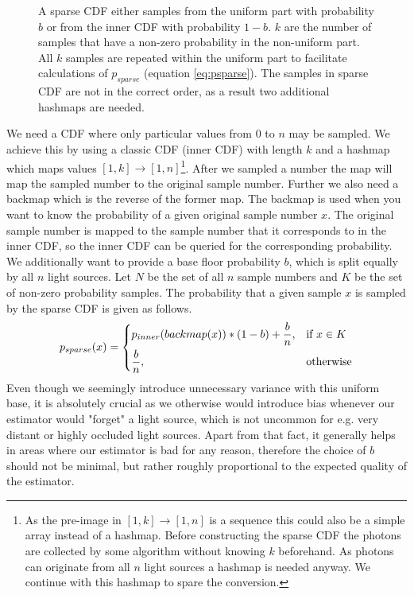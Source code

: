 \begin{figure}[htb]
\begin{tikzpicture}[scale=7, cdf/.style ={thick}]
    \end{tikzpicture}
    \caption{A sparse CDF either samples from the uniform part with probability $b$ or from the inner CDF with probability $1-b$. $k$ are the number of samples that have a non-zero probability in the non-uniform part. All $k$ samples are repeated within the uniform part to facilitate calculations of $p_{sparse}$ (equation \ref{eq:psparse}). The samples in sparse CDF are not in the correct order, as a result two additional hashmaps are needed.} 
    \label{fig:sparseCDF}
\end{figure}

We need a CDF where only particular values from $0$ to $n$ may be sampled. We achieve this by using a classic CDF (inner CDF) with length $k$ and a hashmap which maps values $[1,k]\to [1,n]$\footnote{As the pre-image in $[1,k]\to [1,n]$ is a sequence this could also be a simple array instead of a hashmap. Before constructing the sparse CDF the photons are collected by some algorithm without knowing $k$ beforehand. As photons can originate from all $n$ light sources a hashmap is needed anyway. We continue with this hashmap to spare the conversion.}. After we sampled a number the map will map the sampled number to the original sample number. Further we also need a backmap which is the reverse of the former map. The backmap is used when you want to know the probability of a given original sample number $x$. The original sample number is mapped to the sample number that it corresponds to in the inner CDF, so the inner CDF can be queried for the corresponding probability. We additionally want to provide a base floor probability $b$, which is split equally by all $n$ light sources. Let $N$ be the set of all $n$ sample numbers and $K$ be the set of non-zero probability samples. The probability that a given sample $x$ is sampled by the sparse CDF is given as follows.
\begin{equation}\label{eq:psparse}
 p_{sparse}(x) = 
\begin{dcases}
    p_{inner}(backmap(x)) * (1 - b) + \frac{b}{n},& \text{if } x \in K\\
    \frac{b}{n}, & \text{otherwise}
\end{dcases}
\end{equation}
Even though we seemingly introduce unnecessary variance with this uniform base, it is absolutely crucial as we otherwise would introduce bias whenever our estimator would "forget" a light source, which is not uncommon for e.g. very distant or highly occluded light sources. Apart from that fact, it generally helps in areas where our estimator is bad for any reason, therefore the choice of $b$ should not be minimal, but rather roughly proportional to the expected quality of the estimator.

